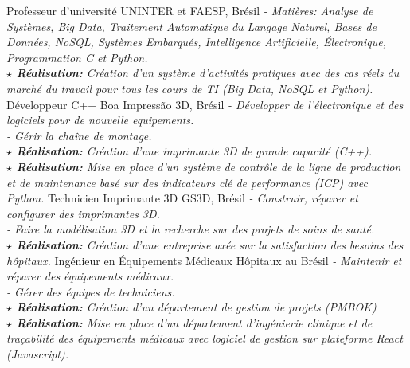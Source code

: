 \documentclass[letterpaper]{twentysecondcv_fr} %
\begin{document}
\begin{twenty} %
						{Professeur d'université}
						{UNINTER et FAESP, Brésil}
						{\emph{
						- Matières: Analyse de Systèmes, Big Data, Traitement Automatique 
						du Langage Naturel, Bases de Données, NoSQL, Systèmes 
						Embarqués, Intelligence Artificielle, Électronique, Programmation C 
						et Python.\\
						\textbf{$ \star $ Réalisation:} Création d'un système d'activités 
						pratiques avec des cas réels du marché du travail pour tous les 
						cours de TI (Big Data, NoSQL et Python).}}
						{Développeur C++}
						{Boa Impressão 3D, Brésil}
						{\emph{- Développer de l'électronique et des logiciels pour de 
						nouvelle equipements.\\
						- Gérir la chaîne de montage.\\
						\textbf{$ \star $ Réalisation:} Création d'une imprimante 3D de 
						grande capacité (C++).\\
						\textbf{$ \star $ Réalisation:} Mise en place d'un système 
						de contrôle de la ligne de production et de maintenance basé sur 
						des indicateurs clé de performance (ICP) avec Python.}}
						{Technicien Imprimante 3D}
						{GS3D, Brésil}
						{\emph{- Construir, réparer et configurer des imprimantes 3D.\\
						- Faire la modélisation 3D et la recherche sur des projets de soins 
						de santé.\\
						\textbf{$ \star $ Réalisation:} Création d'une entreprise axée sur 
						la satisfaction des besoins des hôpitaux.}}
						{Ingénieur en Équipements Médicaux}
						{Hôpitaux au Brésil}
						{\emph{- Maintenir et réparer des équipements médicaux.\\
						- Gérer des équipes de techniciens.\\
						\textbf{$ \star $ Réalisation:} Création d'un département de gestion 
						de projets (PMBOK)\\
						\textbf{$ \star $ Réalisation:} Mise en place d'un département 
						d'ingénierie clinique et de traçabilité des équipements médicaux 
						avec logiciel de gestion sur plateforme React (Javascript).}}
\end{twenty}

\end{document}
